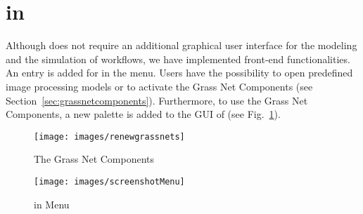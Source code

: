 \section{\RenewGrass{} in \Renew{}}
\label{sec:renewgrassinrenew}
%
Although \RenewGrass{} does not require an additional graphical user interface for the modeling and the simulation of workflows, we have implemented front-end functionalities.
%
An entry is added for \RenewGrass{} in the menu. 
%
Users have the possibility to open predefined image processing models or to activate the Grass Net Components (see Section~\ref{sec:grassnetcomponents}). 
%
Furthermore, to use the Grass Net Components, a new palette is added to the GUI of \Renew{} (see Fig.~\ref{fig:netcomp}).  
%
\begin{figure}[!t]
    \centering
  \texttt{[image: images/renewgrassnets]}
\caption{The Grass Net Components}
\label{fig:netcomp}
\end{figure} 

%
%

%
%

\begin{figure}[!t]
    \centering
  \texttt{[image: images/screenshotMenu]}
\caption{\RenewGrass{} in \Renew{} Menu}
\label{fig:grassmenu}
\end{figure}




